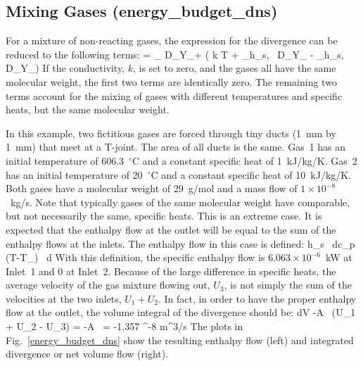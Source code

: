 \documentclass[11pt]{book}
\begin{document}
\clearpage


\subsection{Mixing Gases (\texorpdfstring{{\bf energy\_budget\_dns}}{energy\_budget\_dns})}

For a mixture of non-reacting gases, the expression for the divergence can be reduced to the following terms:
\be \nabla \cdot \bu =  \sum_\alpha {} \nabla \cdot \rho D_\alpha \nabla Y_\alpha +
   \left( \nabla \cdot k \nabla T +
   \sum_\alpha \nabla \cdot h_{s,\alpha} \, \rho D_\alpha \nabla Y_\alpha
 - \sum_\alpha h_{s,\alpha} \nabla \cdot \rho D_\alpha \nabla Y_\alpha  \right) \label{div1} \ee
If the conductivity, $k$, is set to zero, and the gases all have the same molecular weight, the first two terms are identically zero. The remaining two terms account for the
mixing of gases with different temperatures and specific heats, but the same molecular weight.

In this example, two fictitious gases are forced through tiny ducts (1~mm by 1~mm) that meet at a T-joint. The area of all ducts is the same.
Gas~1 has an initial temperature of 606.3~$^\circ$C and a
constant specific heat of 1~kJ/kg/K. Gas~2 has an initial temperature of 20~$^\circ$C and a
constant specific heat of 10~kJ/kg/K. Both gases have a molecular weight of 29~g/mol and a mass flow of $1 \times 10^{-8}$~kg/s. Note that typically gases of the same
molecular weight have comparable, but not necessarily the same, specific heats. This is an extreme case. It is expected that the enthalpy flow at the outlet will be equal to the sum of the
enthalpy flows at the inlets. The enthalpy flow in this case is defined:
\be \int h_s \, \rho \bu \cdot d\bS \equiv \int c_p \, (T-T_\infty) \, \rho \bu \cdot d\bS \ee
With this definition, the specific enthalpy flow is $6.063 \times 10^{-6}$~kW at Inlet~1 and 0 at Inlet~2. Because of the large difference in specific heats, the average velocity
of the gas mixture flowing out, $U_3$, is not simply the sum of the velocities at the two inlets, $U_1+U_2$.
In fact, in order to have the proper enthalpy flow at the outlet, the volume integral
of the divergence should be:
\be \int \nabla \cdot \bu \; dV \equiv -A \, (U_1 + U_2 - U_3) = -A \,  = -1.357 ^{-8} \; \hbox{m}^3/\hbox{s} \label{div2} \ee
The plots in Fig.~\ref{energy_budget_dns} show the resulting enthalpy flow (left) and integrated divergence or net volume flow (right).
\end{document}
